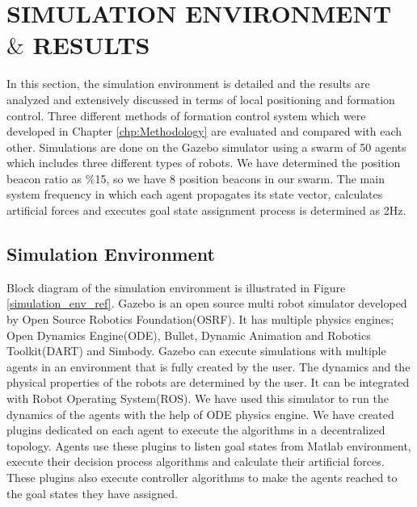 

\chapter{SIMULATION ENVIRONMENT $\&$ RESULTS}
\label{chp:simulation}













In this section, the simulation environment is detailed and the results are analyzed and extensively discussed in terms of local positioning and formation control. Three different methods of formation control system which were developed in Chapter \ref{chp:Methodology} are evaluated and compared with each other. Simulations are done on the Gazebo simulator using a swarm of 50 agents which includes three different types of robots. We have determined the position beacon ratio as $\%$15, so we have 8 position beacons in our swarm. The main system frequency in which each agent propagates its state vector, calculates artificial forces and executes goal state assignment process is determined as 2Hz. 

\section{Simulation Environment}
Block diagram of the simulation environment is illustrated in Figure \ref{simulation_env_ref}. Gazebo is an open source multi robot simulator developed by Open Source Robotics Foundation(OSRF). It has multiple physics engines; Open Dynamics Engine(ODE), Bullet, Dynamic Animation and Robotics Toolkit(DART) and Simbody. Gazebo can execute simulations with multiple agents in an environment that is fully created by the user. The dynamics and the physical properties of the robots are determined by the user. It can be integrated with Robot Operating System(ROS). We have used this simulator to run the dynamics of the agents with the help of ODE physics engine. We have created plugins dedicated on each agent to execute the algorithms in a decentralized topology. Agents use these plugins to  listen goal states from Matlab environment, execute their decision process algorithms and calculate their artificial forces. These plugins also execute controller algorithms to make the agents reached to the goal states they have assigned.

